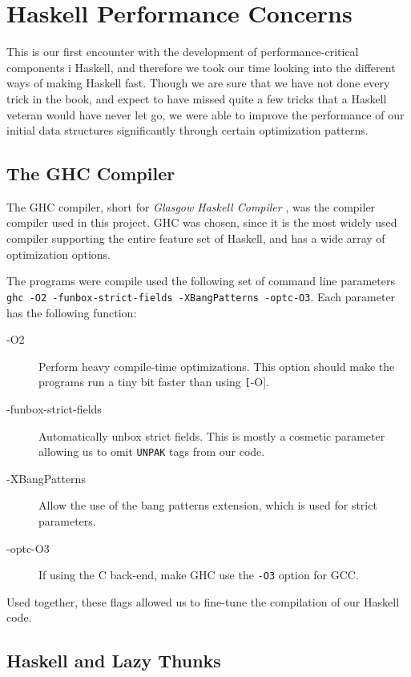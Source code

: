 \section{Haskell Performance Concerns}

This is our first encounter with the development of performance-critical components i Haskell, and therefore we took our time looking into the different ways of making Haskell fast. Though we are sure that we have not done every trick in the book, and expect to have missed quite a few tricks that a Haskell veteran would have never let go, we were able to improve the performance of our initial data structures significantly through certain optimization patterns.

\subsection{The GHC Compiler}
The GHC compiler, short for \textit{Glasgow Haskell Compiler} \citep{ghc}, was the compiler compiler used  in this project. GHC was chosen, since it is the most widely used compiler supporting the entire feature set of Haskell, and has a wide array of optimization options.

The programs were compile used the following set of command line parameters \texttt{ghc -O2 -funbox-strict-fields -XBangPatterns -optc-O3}. Each parameter has the following function:
\begin{description}
\item[-O2] Perform heavy compile-time optimizations. This option should make the programs run a tiny bit faster than using \texttt[-O].
\item[-funbox-strict-fields] Automatically unbox strict fields. This is mostly a cosmetic parameter allowing us to omit \texttt{UNPAK} tags from our code.
\item[-XBangPatterns] Allow the use of the bang patterns extension, which is used for strict parameters.
\item[-optc-O3] If using the C back-end, make GHC use the \texttt{-O3} option for GCC.
\end{description}

Used together, these flags allowed us to fine-tune the compilation of our Haskell code.

\subsection{Haskell and Lazy Thunks}

